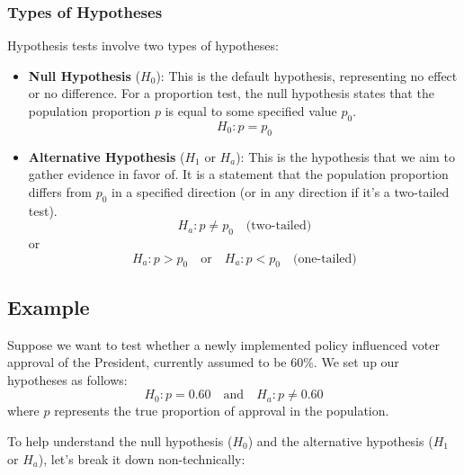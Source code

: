 \documentclass[11pt]{article}
\begin{document}
\subsubsection*{Types of Hypotheses}
Hypothesis tests involve two types of hypotheses:
\begin{itemize}
    \item \textbf{Null Hypothesis} (\( H_0 \)): This is the default hypothesis, representing no effect or no difference. For a proportion test, the null hypothesis states that the population proportion \( p \) is equal to some specified value \( p_0 \).
    \[
    H_0: p = p_0
    \]
    \item \textbf{Alternative Hypothesis} (\( H_1 \) or \( H_a \)): This is the hypothesis that we aim to gather evidence in favor of. It is a statement that the population proportion differs from \( p_0 \) in a specified direction (or in any direction if it’s a two-tailed test).
    \[
    H_a: p \neq p_0 \quad \text{(two-tailed)}
    \]
    or
    \[
    H_a: p > p_0 \quad \text{or} \quad H_a: p < p_0 \quad \text{(one-tailed)}
    \]
\end{itemize}

\subsection*{Example}
Suppose we want to test whether a newly implemented policy influenced voter approval of the President, currently assumed to be 60\%. We set up our hypotheses as follows:
\[
H_0: p = 0.60 \quad \text{and} \quad H_a: p \neq 0.60
\]
where \( p \) represents the true proportion of approval in the population.

To help understand the null hypothesis (\( H_0 \)) and the alternative hypothesis (\( H_1 \) or \( H_a \)), let's break it down non-technically:
\end{document}
